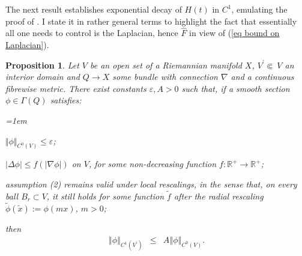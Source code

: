 \documentclass{article}
\newtheorem{proposition}[theorem]{Proposition}
\begin{document}
 
The next result establishes exponential decay of $H\left(
t\right) $ in $C^{1}$, emulating the proof of \cite[Proposition 8]{Approx instantons}. I state it in rather general terms to highlight
the fact that essentially all one needs to control is the Laplacian, hence $\hat{F}$ in view of (\ref{eq bound on Laplacian}). 
\begin{proposition}     \label{Prop regularity on smaller open set}
Let $V$ be an open set of a
Riemannian manifold $X$, $V^{\prime }\Subset\ V$ an interior domain and $Q\rightarrow X$ some bundle with connection $\nabla $ and a continuous
fibrewise metric. There exist constants $\varepsilon ,A>0$ such that, if a smooth section $\phi \in \Gamma (Q) $ satisfies:

\begin{list}{}{\leftmargin=1em}
        \item[(1)] 
$\Vert \phi \Vert _{C^{0}\left( V\right) }\leq \varepsilon $;        
        \item[(2)] 
$\vert \Delta \phi \vert \leq f\left( \left\vert \nabla
\phi \right\vert \right) $ on $V$, for some non-decreasing function $f:%
\mathbb{R}^{+}\rightarrow \mathbb{R}^{+}$;        
        \item[(2')] 
assumption (2) remains valid under local rescalings, in the sense that, on every ball $B_{r}\subset V$, it still holds
for some function $\tilde{f}$ after the radial rescaling 
$\tilde{\phi}\left( \tilde{x}\right) := \phi
\left( mx\right) $, $m>0$;
\end{list}
then 
\begin{eqnarray*}
        \left\Vert \phi \right\Vert _{C^{1}\left( V^{\prime }\right) }
        &\leq& 
        A\left\Vert \phi \right\Vert _{C^{0}\left( V\right) }.  
\end{eqnarray*}


\end{proposition}
\end{document}
